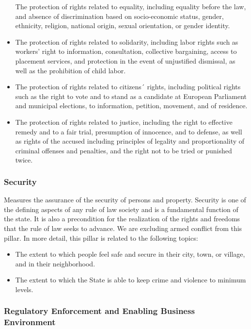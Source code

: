 \documentclass[
]{agujournal2019}
\providecommand{\tightlist}{%
  \setlength{\itemsep}{0pt}\setlength{\parskip}{0pt}}\usepackage{longtable,booktabs,array}
\begin{document}
\begin{itemize}
  The protection of rights related to equality, including equality
  before the law, and absence of discrimination based on socio-economic
  status, gender, ethnicity, religion, national origin, sexual
  orientation, or gender identity.
\item
  The protection of rights related to solidarity, including labor rights
  such as workers' right to information, consultation, collective
  bargaining, access to placement services, and protection in the event
  of unjustified dismissal, as well as the prohibition of child labor.
\item
  The protection of rights related to citizens´ rights, including
  political rights such as the right to vote and to stand as a candidate
  at European Parliament and municipal elections, to information,
  petition, movement, and of residence.
\item
  The protection of rights related to justice, including the right to
  effective remedy and to a fair trial, presumption of innocence, and to
  defense, as well as rights of the accused including principles of
  legality and proportionality of criminal offenses and penalties, and
  the right not to be tried or punished twice.
\end{itemize}

\subsubsection{Security}\label{security}

Measures the assurance of the security of persons and property. Security
is one of the defining aspects of any rule of law society and is a
fundamental function of the state. It is also a precondition for the
realization of the rights and freedoms that the rule of law seeks to
advance. We are excluding armed conflict from this pillar. In more
detail, this pillar is related to the following topics:

\begin{itemize}
\tightlist
\item
  The extent to which people feel safe and secure in their city, town,
  or village, and in their neighborhood.
\item
  The extent to which the State is able to keep crime and violence to
  minimum levels.
\end{itemize}

\subsubsection{Regulatory Enforcement and Enabling Business
Environment}\label{regulatory-enforcement-and-enabling-business-environment}
\end{document}
